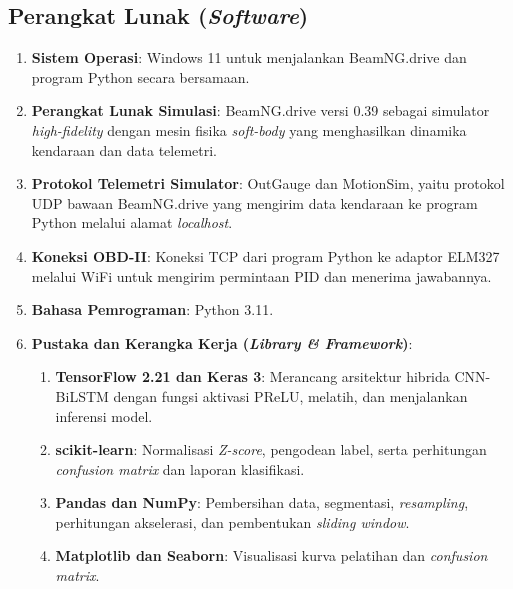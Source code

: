\subsection{Perangkat Lunak (\textit{Software})}
\begin{enumerate}[label=\arabic*), nosep, leftmargin=1.5em]
  \item \textbf{Sistem Operasi}: Windows 11 untuk menjalankan BeamNG.drive dan program Python secara bersamaan.
  \item \textbf{Perangkat Lunak Simulasi}: BeamNG.drive versi 0.39 sebagai simulator \textit{high-fidelity} dengan mesin fisika \textit{soft-body} yang menghasilkan dinamika kendaraan dan data telemetri.
  \item \textbf{Protokol Telemetri Simulator}: OutGauge dan MotionSim, yaitu protokol UDP bawaan BeamNG.drive yang mengirim data kendaraan ke program Python melalui alamat \textit{localhost}.
  \item \textbf{Koneksi OBD-II}: Koneksi TCP dari program Python ke adaptor ELM327 melalui WiFi untuk mengirim permintaan PID dan menerima jawabannya.
  \item \textbf{Bahasa Pemrograman}: Python 3.11.
  \item \textbf{Pustaka dan Kerangka Kerja (\textit{Library \& Framework})}:
  \begin{enumerate}[label=\alph*), nosep, leftmargin=1.5em]
    \item \textbf{TensorFlow 2.21 dan Keras 3}: Merancang arsitektur hibrida CNN-BiLSTM dengan fungsi aktivasi PReLU, melatih, dan menjalankan inferensi model.
    \item \textbf{scikit-learn}: Normalisasi \textit{Z-score}, pengodean label, serta perhitungan \textit{confusion matrix} dan laporan klasifikasi.
    \item \textbf{Pandas dan NumPy}: Pembersihan data, segmentasi, \textit{resampling}, perhitungan akselerasi, dan pembentukan \textit{sliding window}.
    \item \textbf{Matplotlib dan Seaborn}: Visualisasi kurva pelatihan dan \textit{confusion matrix}.
  \end{enumerate}
\end{enumerate}

